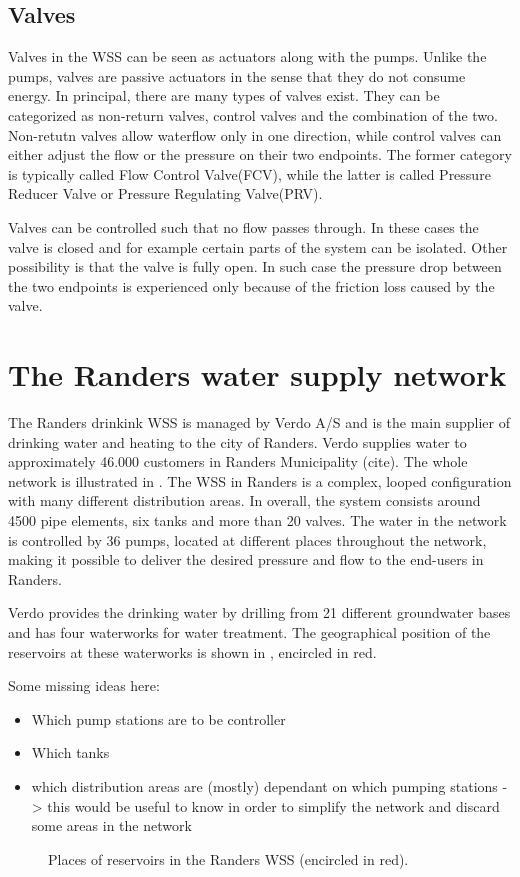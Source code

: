 \subsection{Valves}
\label{valves}

Valves in the WSS can be seen as actuators along with the pumps. Unlike the pumps, valves are passive actuators in the sense that they do not consume energy. In principal, there are many types of valves exist. They can be categorized as non-return valves, control valves and the combination of the two. Non-retutn valves allow waterflow only in one direction, while control valves can either adjust the flow or the pressure on their two endpoints. The former category is typically called Flow Control Valve(FCV), while the latter is called Pressure Reducer Valve or Pressure Regulating Valve(PRV). 

Valves can be controlled such that no flow passes through. In these cases the valve is closed and for example certain parts of the system can be isolated. Other possibility is that the valve is fully open. In such case the pressure drop between the two endpoints is experienced only because of the friction loss caused by the valve. 

\section{The Randers water supply network}
\label{the_randers_water_supply_network}

The Randers drinkink WSS is managed by Verdo A/S and is the main supplier of drinking water and heating to the city of Randers. Verdo supplies water to approximately 46.000 customers in Randers Municipality (cite). The whole network is illustrated in . The WSS in Randers is a complex, looped configuration with many different distribution areas. In overall, the system consists around 4500 pipe elements, six tanks and more than 20 valves. The water in the network is controlled by 36 pumps, located at different places throughout the network, making it possible to deliver the desired pressure and flow to the end-users in Randers.

Verdo provides the drinking water by drilling from 21 different groundwater bases and has four waterworks for water treatment. The geographical position of the reservoirs at these waterworks is shown in , encircled in red.   

Some missing ideas here:
\begin{itemize}
  \item Which pump stations are to be controller
  \item Which tanks 
  \item which distribution areas are (mostly) dependant on which pumping stations -> this would be useful to know in order to simplify the network and discard some areas in the network 
\end{itemize}

\begin{figure}[H]
\centering
 
\caption{Places of reservoirs in the Randers WSS (encircled in red).}
\label{fig:reservoirs_epanet}
\end{figure}